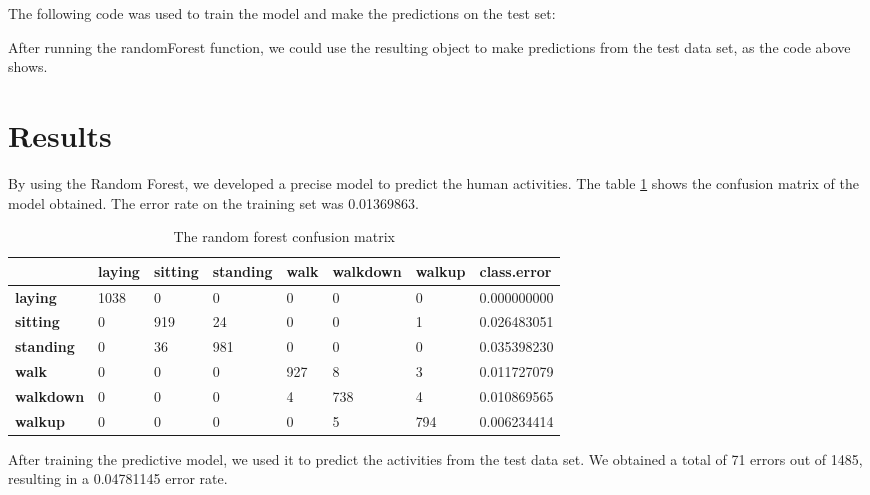 \documentclass[IEEEtran]{IEEEtran}
\begin{document}
The following code was used to train the model and make the predictions on the test set:

\begin{scriptsize}

\end{scriptsize}

After running the randomForest function, we could use the resulting object to
make predictions from the test data set, as the code above shows. 


\section{Results}

By using the Random Forest, we developed a precise model to predict the human
activities. The table \ref{forest-out} shows the confusion matrix of the model
obtained. The error rate on the training set was 0.01369863. 

\begin{table}
	\centering
	\begin{tabular}{ | p{1.2cm} | p{1.2cm} | p{1.2cm} | p{1.2cm} | p{1.2cm} | p{1.2cm} | p{1.2cm} | p{1.5cm} | }
		\hline
           & \textbf{laying} & \textbf{sitting} & \textbf{standing} & \textbf{walk} & \textbf{walkdown} & \textbf{walkup} & \textbf{class.error} \\
		\hline
         \textbf{laying}     & 1038       & 0        & 0    & 0        & 0      & 0 & 0.000000000 \\
         \textbf{sitting}       & 0     & 919       & 24    & 0       &  0      & 1 & 0.026483051 \\
         \textbf{standing}      & 0      & 36      & 981    & 0       &  0      & 0 & 0.035398230 \\
         \textbf{walk}          & 0       & 0        & 0  & 927       &  8      & 3 & 0.011727079 \\
         \textbf{walkdown}      & 0      &  0        & 0    & 4      & 738      & 4 & 0.010869565 \\
         \textbf{walkup}        & 0      &  0        & 0    & 0       &  5    & 794 & 0.006234414 \\
		\hline
	\end{tabular}
    \vspace{0.3cm}
	\caption{The random forest confusion matrix}
	\label{forest-out}
\end{table}

After training the predictive model, we used it to predict the activities from
the test data set.  We obtained a total of 71 errors out of 1485, resulting in
a 0.04781145 error rate.
\end{document}
